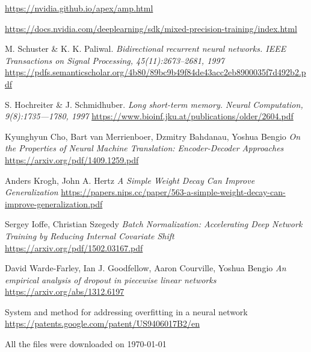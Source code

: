 \documentclass[licencjacka,en]{pracamgr}
\newcommand{\bibDownloadDate}{\today}
\begin{document}
\begin{thebibliography}{99}
 \href{https://nvidia.github.io/apex/amp.html}{https://nvidia.github.io/apex/amp.html}

 \href{https://docs.nvidia.com/deeplearning/sdk/mixed-precision-training/index.html}{https://docs.nvidia.com/deeplearning/sdk/mixed-precision-training/index.html}

 M. Schuster \& K. K. Paliwal. \textit{Bidirectional recurrent neural networks. IEEE Transactions on Signal Processing, 45(11):2673–2681, 1997} \href{https://pdfs.semanticscholar.org/4b80/89bc9b49f84de43acc2eb8900035f7d492b2.pdf}{https://pdfs.semanticscholar.org/4b80/89bc9b49f84de43acc2eb8900035f7d492b2.pdf}

 S. Hochreiter \& J. Schmidhuber. \textit{Long short-term memory. Neural Computation, 9(8):1735—1780, 1997} \href{https://www.bioinf.jku.at/publications/older/2604.pdf}{https://www.bioinf.jku.at/publications/older/2604.pdf}

 Kyunghyun Cho, Bart van Merrienboer, Dzmitry Bahdanau, Yoshua Bengio \textit{On the Properties of Neural Machine Translation: Encoder-Decoder Approaches} \href{https://arxiv.org/pdf/1409.1259.pdf}{https://arxiv.org/pdf/1409.1259.pdf}

 Anders Krogh, John A. Hertz \textit{A Simple Weight Decay Can Improve Generalization} \href{https://papers.nips.cc/paper/563-a-simple-weight-decay-can-improve-generalization.pdf}{https://papers.nips.cc/paper/563-a-simple-weight-decay-can-improve-generalization.pdf}

 Sergey Ioffe, Christian Szegedy \textit{Batch Normalization: Accelerating Deep Network Training by Reducing Internal Covariate Shift} \href{https://arxiv.org/pdf/1502.03167.pdf}{https://arxiv.org/pdf/1502.03167.pdf}

 David Warde-Farley, Ian J. Goodfellow, Aaron Courville, Yoshua Bengio \textit{An empirical analysis of dropout in piecewise linear networks
} \href{https://arxiv.org/abs/1312.6197}{https://arxiv.org/abs/1312.6197}

 System and method for addressing overfitting in a neural network \href{https://patents.google.com/patent/US9406017B2/en}{https://patents.google.com/patent/US9406017B2/en}

\end{thebibliography}
All the files were downloaded on \bibDownloadDate
\end{document}
